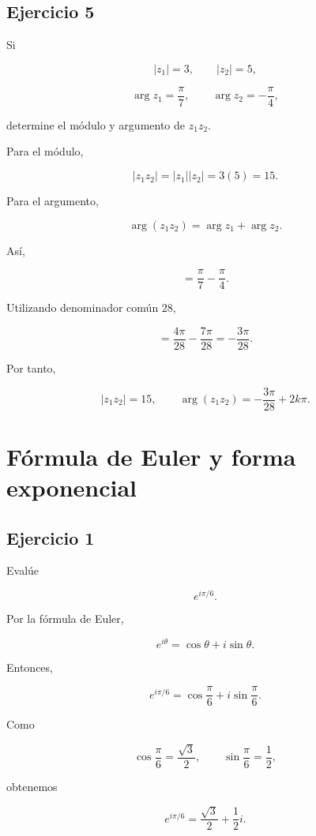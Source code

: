 \documentclass[12pt]{article}
\begin{document}
\subsection*{Ejercicio 5}

Si

\[
|z_1|=3,
\qquad
|z_2|=5,
\]

\[
\arg z_1=\frac{\pi}{7},
\qquad
\arg z_2=-\frac{\pi}{4},
\]

determine el módulo y argumento de \(z_1z_2\).

Para el módulo,

\[
|z_1z_2|
=
|z_1||z_2|
=
3(5)
=
15.
\]

Para el argumento,

\[
\arg(z_1z_2)
=
\arg z_1+\arg z_2.
\]

Así,

\[
=
\frac{\pi}{7}-\frac{\pi}{4}.
\]

Utilizando denominador común \(28\),

\[
=
\frac{4\pi}{28}-\frac{7\pi}{28}
=
-\frac{3\pi}{28}.
\]

Por tanto,

\[
\boxed{
|z_1z_2|=15,
\qquad
\arg(z_1z_2)
=
-\frac{3\pi}{28}+2k\pi
}.
\]

\section*{Fórmula de Euler y forma exponencial}

\subsection*{Ejercicio 1}

Evalúe

\[
e^{i\pi/6}.
\]

Por la fórmula de Euler,

\[
e^{i\theta}
=
\cos\theta+i\sin\theta.
\]

Entonces,

\[
e^{i\pi/6}
=
\cos\frac{\pi}{6}
+
i\sin\frac{\pi}{6}.
\]

Como

\[
\cos\frac{\pi}{6}
=
\frac{\sqrt3}{2},
\qquad
\sin\frac{\pi}{6}
=
\frac12,
\]

obtenemos

\[
\boxed{
e^{i\pi/6}
=
\frac{\sqrt3}{2}
+
\frac12i
}.
\]
\end{document}
